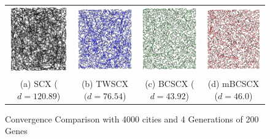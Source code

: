 \begin{figure}
\centering
\begin{tabular}{cccc}
\includegraphics[width=4.3cm]{images/SCX4000_4Gen.jpg} &
\includegraphics[width=4.3cm]{images/TWSCX4000_4Gen.jpg} & 
\includegraphics[width=4.3cm]{images/BCSCX4000_4Gen.jpg} &
\includegraphics[width=4.3cm]{images/mBCSCX4000_4Gen.jpg} \\
(a) SCX ($d=120.89$) & (b) TWSCX $(d=76.54$) & (c) BCSCX ($d=43.92$) & (d) mBCSCX ($d=46.0$)
\end{tabular}
\caption{Convergence Comparison with 4000 cities and 4 Generations of  200 Genes}
\label{fig:ConvergenceWith4000Cities}
\end{figure}

